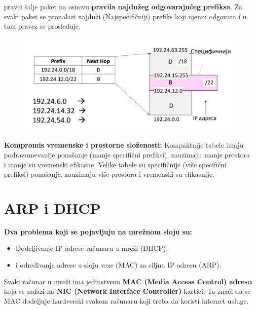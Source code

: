 \documentclass[a4paper]{article}
\begin{document}
    pravci šalje paket na osnovu \textbf{pravila najdužeg odgovarajućeg prefiksa}. Za svaki paket
    se pronalazi najduži (Najspecifičniji) prefiks koji njemu odgovara i u tom pravcz
    se prosleđuje.
    \begin{figure}[H]
        \begin{center}
            \includegraphics[width=120mm,height=50mm]{Slike/cidr2.png}
        \end{center}
    \end{figure}
    \textbf{Kompromis vremenske i prostorne složenosti:} Kompaktnije tabele imaju podrazumevanije
    ponašanje (manje specifični prefiksi), zauzimaju manje prostora i manje su vremenski efikasne.
    Velike tabele su specifičnije (više specifični prefiksi) ponašanje, zauzimaju više prostora
    i vremenski su efikasnije.

\section{ARP i DHCP}
    \noindent \textbf{Dva problema koji se pojavljuju na mrežnom sloju su:}
    \begin{itemize}
        \item Dodeljivanje IP adrese računaru u mreži (DHCP);
        \item i određivanje adrese u sloju veze (MAC) za ciljnu IP adresu (ARP).
    \end{itemize}

    Svaki računar u mreži ima jedinstvenu \textbf{MAC (Media Access Control) adresu} koja se nalazi
    na \textbf{NIC (Network Interface Controller)} kartici. To znači da se MAC dodeljuje hardverski svakom
    računaru koji treba da koristi internet usluge.
\end{document}
